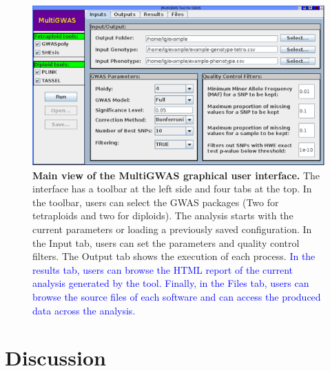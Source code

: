 \documentclass{article}
\begin{document}
\begin{figure}[H]
\begin{centering}
\includegraphics[scale=0.5]{images/paper-implementation-jmultiGWAS}
\par\end{centering}
\caption{\textbf{Main view of the MultiGWAS graphical user interface.}  The interface has a toolbar at the left side and four tabs at the top. In the toolbar, users can select the GWAS packages (Two for tetraploids and two for diploids). The analysis starts with the current parameters or loading a previously saved configuration. In the Input tab, users can set the parameters and quality control filters. The Output tab shows the execution of each process. \textcolor{blue}{In the results tab, users can browse the HTML report of the current analysis generated by the tool. Finally, in the Files tab, users can browse the source files of each software and can access the produced data across the analysis.}}\label{fig:MultiGWAS-interaction} 
\end{figure}

\section{Discussion}
\end{document}
